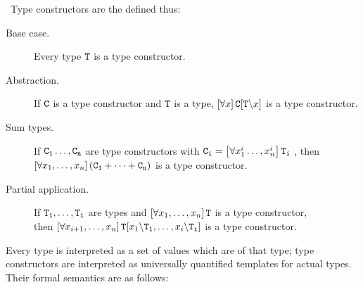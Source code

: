 \begin{definition}\label{def:typeCon}\
	Type constructors are the defined thus:
	\begin{description}
		\item[Base case.] Every type $\mathtt{T}$ is a type constructor.
		\item[Abstraction.] If $\mathtt{C}$ is a type constructor and $\mathtt{T}$ is a type, $\left[\forall x \right] \mathtt{C}[\mathtt{T}\backslash x]$ is a type constructor.
		\item[Sum types.] If $\mathtt{C_1}\dots,\mathtt{C_n}$ are type constructors with $\mathtt{C_i} = \left[\forall x^i_1\dots,x^i_n \right] \mathtt{T_i}$ , then\\ $\left[\forall x_1,\dots,x_n \right] (\mathtt{C_1} + \dots + \mathtt{C_n})$ is a type constructor.
		\item[Partial application.] If $\mathtt{T_1},\dots,\mathtt{T_i}$ \paren{$i < n$} are types and $\left[\forall x_1,\dots,x_n \right] \mathtt{T}$ is a type constructor,\\ then $\left[\forall x_{i+1},\dots,x_n \right] \mathtt{T}[x_1\backslash \mathtt{T_1},\dots,x_i\backslash \mathtt{T_i}]$ is a type constructor.
	\end{description}
\end{definition}

Every type is interpreted as a set of values which are of that type; type constructors are interpreted as universally quantified templates for actual types. Their formal semantics are as follows:

